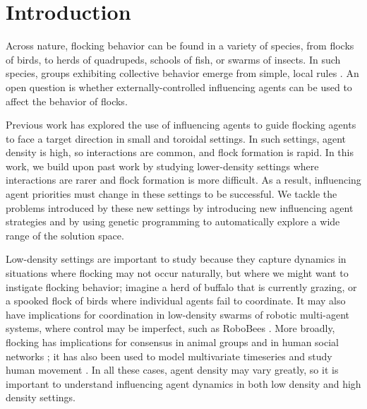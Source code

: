 \chapter{Introduction}
\label{ch:introduction}

%


Across nature, flocking behavior can be found in a variety of species, from 
flocks of birds, to herds of quadrupeds, schools of fish, or swarms of insects.
In such species, groups exhibiting collective behavior emerge from simple, 
local rules \citep{sumpter2010collective}.
An open question is whether externally-controlled influencing agents can be 
used to affect the behavior of flocks.

Previous work \cite{genter2013backsearch, genter2013visionstationary, 
genter2014neighborsorientherd, genter2015placement, genter2016facegoalfacecurrent, 
genter201612steplookahead, genterthesis}
has explored the use of influencing agents to guide flocking 
agents to face a target direction in small and toroidal settings.
In such settings, agent density is high, so interactions are common, and flock
formation is rapid.
In this work, we build upon past work by studying lower-density settings where
interactions are rarer and flock formation is more difficult.
As a result, influencing agent priorities must change in these settings to be
successful.
We tackle the problems introduced by these new settings by introducing new
influencing agent strategies and by using genetic programming to automatically
explore a wide range of the solution space.

Low-density settings are important to study because they capture dynamics in
situations where flocking may not occur naturally, but where we might want to
instigate flocking behavior; imagine a herd of buffalo that is currently
grazing, or a spooked flock of birds where individual agents fail to
coordinate.
It may also have implications for coordination in low-density swarms of
robotic multi-agent systems, where control may be imperfect, such as RoboBees
\cite{Chen2017Robobees}.
More broadly, flocking has implications for consensus in animal groups
\cite{Yang2006Consensus, sumpter2008fish, couzin2005} and in human social
networks \cite{liang2012opinion};
it has also been used to model multivariate timeseries and study human
movement \cite{schruben2010multivariate, singham2011agentmovement}.
In all these cases, agent density may vary greatly, so it is important to
understand influencing agent dynamics in both low density and high density
settings.

